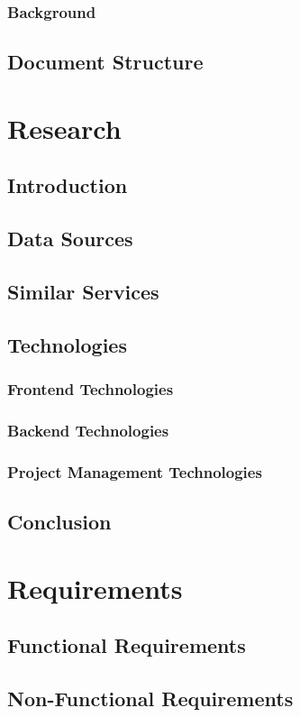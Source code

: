 \documentclass[a4paper,11pt]{report}
\begin{document}
\subsection{Background}
\section{Document Structure}

\chapter{Research}
\section{Introduction}
\section{Data Sources}
\section{Similar Services}
\section{Technologies}
\subsection{Frontend Technologies}
\subsection{Backend Technologies}
\subsection{Project Management Technologies}
\section{Conclusion}

\chapter{Requirements}
\section{Functional Requirements}
\section{Non-Functional Requirements}
\end{document}
